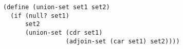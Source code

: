 \documentclass[a4paper,12pt]{article}
\begin{document}
\begin{lstlisting}
(define (union-set set1 set2)
  (if (null? set1)
      set2
      (union-set (cdr set1)
                 (adjoin-set (car set1) set2))))
\end{lstlisting}
\end{document}
